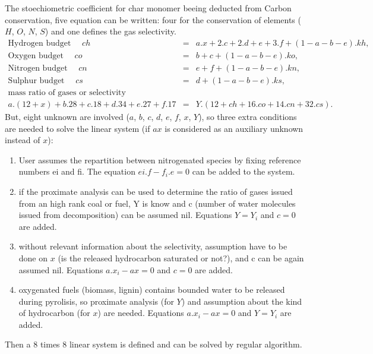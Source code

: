 The stoechiometric coefficient for char monomer beeing deducted from Carbon
conservation, five equation can be written: four for the conservation of
elements ($H$, $O$, $N$, $S$) and one defines the gas selectivity.
\begin{eqnarray*}
  \text{Hydrogen budget  } \quad ch &=& a.x + 2.c + 2.d + e + 3.f +(1-a-b-e).kh, \\
  \text{Oxygen budget    } \quad co &=& b + c + (1-a-b-e) . ko, \\
  \text{Nitrogen budget  } \quad cn &=& e + f + (1-a-b-e).kn, \\
  \text{Sulphur budget   } \quad cs &=& d + (1-a-b-e) .ks, \\
  \text{mass ratio of gases or selectivity} \\
  a.(12+x) + b.28 +c.18+d.34+e.27+f.17 &=& Y .(12+ch+16.co+14.cn+32.cs).
\end{eqnarray*}
But, eight unknown are involved ($a$, $b$, $c$, $d$, $e$, $f$, $x$, $Y$), so three extra
conditions are needed to solve the linear system (if $ax$ is considered as an
auxiliary unknown instead of $x$):
\begin{enumerate}

\item User assumes the repartition between nitrogenated species by fixing
  reference numbers ei and fi. The equation $ei.f-f_i.e=0$ can be added to the
  system.
\item if the proximate analysis can be used to determine the ratio of gases
  issued from an high rank coal or fuel, Y is know and c (number of water
  molecules issued from decomposition) can be assumed nil. Equations $Y=Y_i$ and
  $c=0$ are added.
\item without relevant information about the selectivity, assumption have to be
  done on $x$ (is the released hydrocarbon saturated or not?), and c can be again
  assumed nil. Equations $a.x_i-ax = 0$ and $c=0$ are added.
\item oxygenated fuels (biomass, lignin) contains bounded water to be released
  during pyrolisis, so proximate analysis (for $Y$) and assumption about the kind
  of hydrocarbon (for $x$) are needed. Equations $a.x_i-ax = 0$ and $Y=Y_i$ are
  added.

\end{enumerate}
Then a 8 times 8 linear system is defined and can be solved by regular algorithm.

